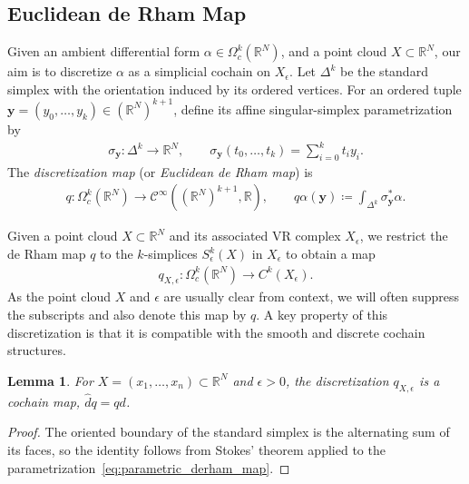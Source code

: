 \documentclass[11pt,reqno]{amsproc}
\numberwithin{equation}{section}
\newcommand{\R}{\mathbb{R}}
\newcommand{\by}{\mathbf{y}}
\newcommand{\cC}{\mathcal{C}}
\newcommand{\hd}{\hat{d}}
\newtheorem{lemma}[counter]{Lemma}
\theoremstyle{definition}
\theoremstyle{plain}
\begin{document}
    \subsection{Euclidean de Rham Map} \label{ssec:euclidean_derham}
    Given an ambient differential form $\alpha \in \Omega^k_c(\R^N)$, and a point cloud $X \subset \R^N$, our aim is to discretize $\alpha$ as a simplicial cochain on $X_\epsilon$. Let $\Delta^k$ be the standard simplex with the orientation induced by its ordered vertices. For an ordered tuple $\by=(y_0,\ldots,y_k)\in(\R^N)^{k+1}$, define its affine singular-simplex parametrization by
    \begin{align}
        \sigma_{\by}:\Delta^k\longrightarrow\R^N,
        \qquad
        \sigma_{\by}(t_0,\ldots,t_k)=\sum_{i=0}^k t_i y_i.
    \end{align}
    The \emph{discretization map} (or \emph{Euclidean de Rham map}) is
    \begin{align} \label{eq:parametric_derham_map}
        q : \Omega^k_c(\R^N) \to \cC^\infty\left( (\R^N)^{k+1}, \R\right),
        \qquad
        q\alpha(\by) \coloneqq \int_{\Delta^k}\sigma_{\by}^*\alpha.
    \end{align}

    Given a point cloud $X \subset \R^N$ and its associated VR complex $X_\epsilon$, we restrict the de Rham map $q$ to the $k$-simplices $S^k_\epsilon(X)$ in $X_\epsilon$ to obtain a map
    \begin{align} \label{eq:q_cochain_map}
        q_{X, \epsilon} : \Omega^k_c(\R^N) \to C^k(X_\epsilon). 
    \end{align}
    As the point cloud $X$ and $\epsilon$ are usually clear from context, we will often suppress the subscripts and also denote this map by $q$.
    A key property of this discretization is that it is compatible with the smooth and discrete cochain structures.

    \begin{lemma} \label{lem:cochain_map}
        For $X = (x_1, \ldots, x_n) \subset \R^N$ and $\epsilon > 0$, the discretization $q_{X,\epsilon}$ is a cochain map, $\hd q = q d$. 
    \end{lemma}
    \begin{proof}
        The oriented boundary of the standard simplex is the alternating sum of its faces, so the identity follows from Stokes' theorem applied to the  parametrization~\eqref{eq:parametric_derham_map}.
    \end{proof}
\end{document}
